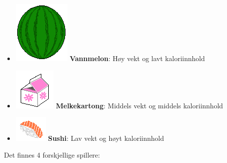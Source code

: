 \documentclass[paper=a4]{article}
\begin{document}
{\renewcommand\labelitemi{}
\begin{itemize}
	\item \includegraphics[scale = 0.3]{images/Vannmelon.png} \textbf{Vannmelon}: Høy vekt og lavt kaloriinnhold
	\item \includegraphics[scale = 0.4]{images/Melkekartong.png} \textbf{Melkekartong}: Middels vekt og middels kaloriinnhold
	\item \includegraphics[scale = 0.5]{images/Sushi.png} \textbf{Sushi}: Lav vekt og høyt kaloriinnhold
\end{itemize}
\newpage
Det finnes 4 forskjellige spillere:

}
\end{document}
